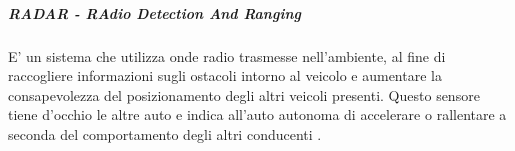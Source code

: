 \documentclass[14pt]{extarticle}
\begin{document}
\subparagraph{RADAR - RAdio Detection And Ranging}
E' un sistema che utilizza onde radio trasmesse nell'ambiente, al fine di raccogliere informazioni sugli  ostacoli intorno al veicolo e aumentare la consapevolezza del  posizionamento degli altri veicoli presenti. Questo sensore tiene
d’occhio le altre auto e indica all’auto autonoma di accelerare o rallentare
a seconda del comportamento degli altri conducenti \cite{das2018risk}.

\end{document}
